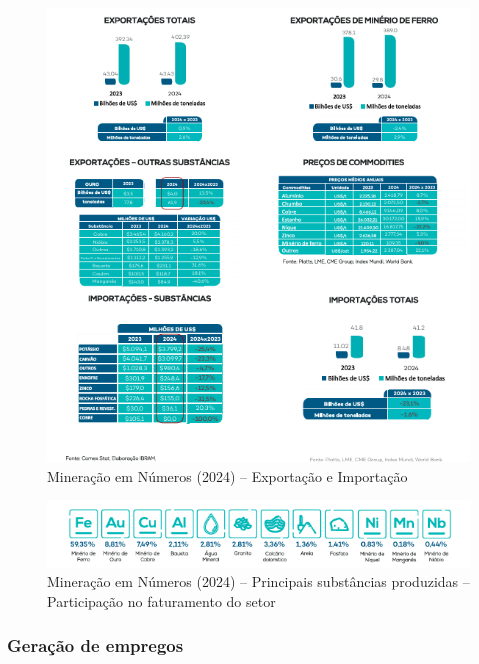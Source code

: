 \begin{figure}[!htb]
    \centering
    \includegraphics[width=\textwidth]{figures/image2_mineracao_numeros_2.png}
    \caption{Mineração em Números (2024) -- Exportação e Importação}
    \label{fig:image2_mineracao_numeros_2}
\end{figure}

\begin{figure}[!htb]
    \centering
    \includegraphics[width=\textwidth]{figures/image3_mineracao_numeros_3.png}
    \caption{Mineração em Números (2024) -- Principais substâncias produzidas -- Participação no faturamento do setor}
    \label{fig:image3_mineracao_numeros_3}
\end{figure}

\subsubsection{Geração de empregos}
\label{subsubsec:geracao_empregos}

